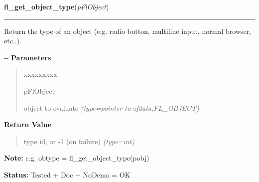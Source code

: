     \vspace{0.5ex}

\hspace{.8\funcindent}\begin{boxedminipage}{\funcwidth}

    \raggedright \textbf{fl\_get\_object\_type}(\textit{pFlObject})

    \vspace{-1.5ex}

    \rule{\textwidth}{0.5\fboxrule}
\setlength{\parskip}{2ex}

Return the type of an object (e.g. radio button, multiline input,
normal browser, etc..).

-{}-
\setlength{\parskip}{1ex}
      \textbf{Parameters}
      \vspace{-1ex}

      \begin{quote}
        \begin{Ventry}{xxxxxxxxx}

          \item[pFlObject]


object to evaluate
            {\it (type=pointer to xfdata.FL\_OBJECT)}

        \end{Ventry}

      \end{quote}

      \textbf{Return Value}
    \vspace{-1ex}

      \begin{quote}

type id, or -1 (on failure)
      {\it (type=int)}

      \end{quote}

\textbf{Note:} 
e.g. obtype = fl\_get\_object\_type(pobj)


\textbf{Status:} 
Tested + Doc + NoDemo = OK


    \end{boxedminipage}

    \label{xformslib:flbasic:fl_set_object_boxtype}

    \vspace{0.5ex}

